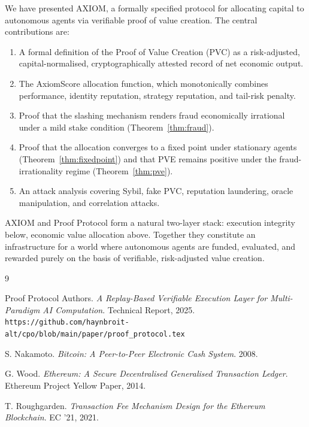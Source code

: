 \documentclass[11pt,a4paper]{article}
\theoremstyle{plain}
\theoremstyle{definition}
\theoremstyle{remark}
\begin{document}
We have presented AXIOM, a formally specified protocol for allocating capital to
autonomous agents via verifiable proof of value creation. The central
contributions are:

\begin{enumerate}[(1)]
  \item A formal definition of the Proof of Value Creation (PVC) as a
        risk-adjusted, capital-normalised, cryptographically attested record
        of net economic output.
  \item The AxiomScore allocation function, which monotonically combines
        performance, identity reputation, strategy reputation, and tail-risk
        penalty.
  \item Proof that the slashing mechanism renders fraud economically irrational
        under a mild stake condition (Theorem~\ref{thm:fraud}).
  \item Proof that the allocation converges to a fixed point under stationary
        agents (Theorem~\ref{thm:fixedpoint}) and that PVE remains positive
        under the fraud-irrationality regime (Theorem~\ref{thm:pve}).
  \item An attack analysis covering Sybil, fake PVC, reputation laundering,
        oracle manipulation, and correlation attacks.
\end{enumerate}

AXIOM and Proof Protocol form a natural two-layer stack: execution integrity
below, economic value allocation above. Together they constitute an
infrastructure for a world where autonomous agents are funded, evaluated, and
rewarded purely on the basis of verifiable, risk-adjusted value creation.


\begin{thebibliography}{9}

Proof Protocol Authors.
\emph{A Replay-Based Verifiable Execution Layer for Multi-Paradigm AI
Computation}.
Technical Report, 2025.
\texttt{https://github.com/haynbroit-alt/cpo/blob/main/paper/proof\_protocol.tex}

S. Nakamoto.
\emph{Bitcoin: A Peer-to-Peer Electronic Cash System}.
2008.

G. Wood.
\emph{Ethereum: A Secure Decentralised Generalised Transaction Ledger}.
Ethereum Project Yellow Paper, 2014.

T. Roughgarden.
\emph{Transaction Fee Mechanism Design for the Ethereum Blockchain}.
EC '21, 2021.

\end{thebibliography}
\end{document}

